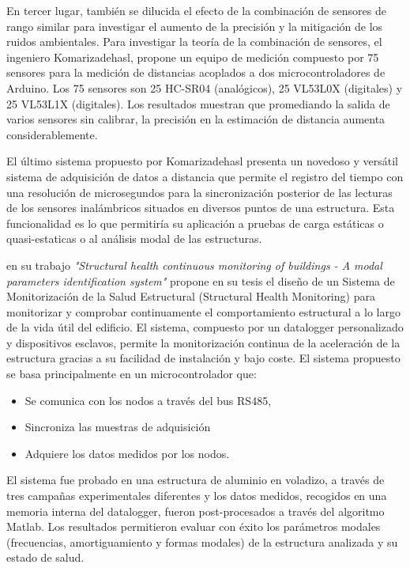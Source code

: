 \documentclass[12pt,letterpaper]{article}
\begin{document}
En tercer lugar, también se dilucida el efecto de la combinación de sensores de rango similar para investigar el aumento de la precisión y la mitigación de los ruidos ambientales. Para investigar la teoría de la combinación de sensores, el ingeniero Komarizadehasl, propone un equipo de medición compuesto por 75 sensores para la medición de distancias acoplados a dos microcontroladores de Arduino. Los 75 sensores son 25 HC-SR04 (analógicos), 25 VL53L0X (digitales) y 25 VL53L1X (digitales). Los resultados muestran que promediando la salida de varios sensores sin calibrar, la precisión en la estimación de distancia aumenta considerablemente.

El último sistema propuesto por Komarizadehasl presenta un novedoso y versátil sistema de adquisición de datos a distancia que permite el registro del tiempo con una resolución de microsegundos para la sincronización posterior de las lecturas de los sensores inalámbricos situados en diversos puntos de una estructura. Esta funcionalidad es lo que permitiría su aplicación a pruebas de carga estáticas o quasi-estaticas o al análisis modal de las estructuras.


\cite{muttillo2019structural} en su trabajo \textit{"Structural health continuous monitoring of buildings - A modal parameters identification system"} propone en su tesis el diseño de un Sistema de Monitorización de la Salud Estructural (Structural Health Monitoring) para monitorizar y comprobar continuamente el comportamiento estructural a lo largo de la vida útil del edificio. El sistema, compuesto por un datalogger personalizado y dispositivos esclavos, permite la monitorización continua de la aceleración de la estructura gracias a su facilidad de instalación y bajo coste. El sistema propuesto se basa principalmente en un microcontrolador que: 

\begin{itemize}
	\item Se comunica con los nodos a través del bus RS485, 
	\item Sincroniza las muestras de adquisición
	\item Adquiere los datos medidos por los nodos.
\end{itemize} 

El sistema fue probado en una estructura de aluminio en voladizo, a través de tres campañas experimentales diferentes y los datos medidos, recogidos en una memoria interna del datalogger, fueron post-procesados a través del algoritmo Matlab. Los resultados permitieron evaluar con éxito los parámetros modales (frecuencias, amortiguamiento y formas modales) de la estructura analizada y su estado de salud.
\end{document}
